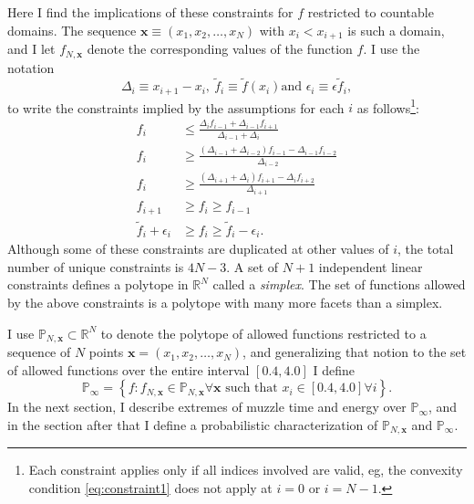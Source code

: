 \documentclass[]{article}
\newcommand{\nomf}{\tilde f} \newcommand{\COST}{\cal C}
\newcommand{\field}[1]{\mathbb{#1}}
\newcommand\REAL{\field{R}}
\newcommand\Polytope[1]{\field{P}_{#1}}
\newcommand\PolytopeN{\Polytope{N,\mathbf{x}}}
\newcommand\PolytopeInf{\Polytope{\infty}}
\newcommand\fN{f_{N,\mathbf{x}}}
\begin{document}
Here I find the implications of these constraints for $f$ restricted
to countable domains.  The sequence $\mathbf{x}\equiv (x_1,x_2,\ldots,x_N)$
with $x_i < x_{i+1}$ is such a domain, and I let $\fN$ denote the
corresponding values of the function $f$.  I use the notation
\begin{equation*}
  \Delta_i \equiv {x_{i+1} - x_i}, ~ \nomf_i \equiv \nomf(x_i) \text{
    and } \epsilon_i \equiv
  \epsilon \nomf_i,
\end{equation*}
to write the constraints implied by the assumptions for each $i$ as
follows\footnote{Each constraint applies only if all indices involved
  are valid, eg, the convexity condition \eqref{eq:constraint1} does
  not apply at $i=0$ or $i=N-1$.}:
\begin{subequations}
  \label{eq:constraint}
  \begin{align}
  \label{eq:constraint1}
  f_i & \leq \frac{\Delta_{i}f_{i-1} + \Delta_{i-1} f_{i+1} } {
    \Delta_{i-1} + \Delta_i } \\
  \label{eq:constraint2}
  f_i & \geq \frac{(\Delta_{i-1} + \Delta_{i-2})f_{i-1} - \Delta_{i-1}
    f_{i-2}}{\Delta_{i-2}} \\
  \label{eq:constraint3}
  f_i & \geq \frac{(\Delta_{i+1} + \Delta_{i})f_{i+1} -
    \Delta_{i}f_{i+2}}{\Delta_{i+1}} \\
  \label{eq:constraint4}
  f_{i+1} & \geq f_i \geq f_{i-1}\\
  \label{eq:constraint5}
  \nomf_i + \epsilon_i &\geq f_i  \geq \nomf_i - \epsilon_i.
\end{align}
\end{subequations}
Although some of these constraints are duplicated at other values of
$i$, the total number of unique constraints is $4N-3$.  A set of $N+1$
independent linear constraints defines a polytope in $\REAL^N$ called
a \emph{simplex}.  The set of functions allowed by the above
constraints is a polytope with many more facets than a simplex.

I use $\PolytopeN \subset \REAL^N$ to denote the polytope of allowed
functions restricted to a sequence of $N$ points $\mathbf{x} = (x_1,x_2,
\ldots, x_N)$, and generalizing that notion to the set of allowed
functions over the entire interval $[0.4, 4.0]$ I define
\begin{equation*}
  \PolytopeInf = \left\{ f: \fN \in \PolytopeN \forall \mathbf{x}
    \text{ such that } x_i \in [0.4,4.0] \forall i \right\}.
\end{equation*}
In the next section, I describe extremes of muzzle time and energy
over $\PolytopeInf$, and in the section after that I define a
probabilistic characterization of $\PolytopeN$ and $\PolytopeInf$.
\end{document}

